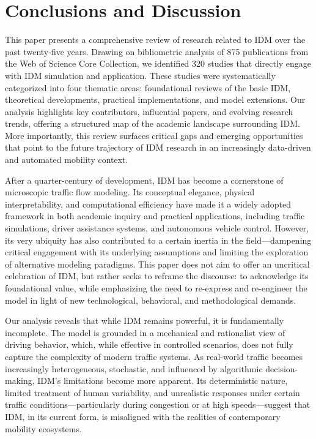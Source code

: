 \documentclass[a4paper,fleqn]{cas-sc}
\begin{document}
\section{Conclusions and Discussion}
\label{sec:conclusion}
This paper presents a comprehensive review of research related to IDM over the past twenty-five years. Drawing on bibliometric analysis of 875 publications from the Web of Science Core Collection, we identified 320 studies that directly engage with IDM simulation and application. These studies were systematically categorized into four thematic areas: foundational reviews of the basic IDM, theoretical developments, practical implementations, and model extensions. Our analysis highlights key contributors, influential papers, and evolving research trends, offering a structured map of the academic landscape surrounding IDM. More importantly, this review surfaces critical gaps and emerging opportunities that point to the future trajectory of IDM research in an increasingly data-driven and automated mobility context.

After a quarter-century of development, IDM has become a cornerstone of microscopic traffic flow modeling. Its conceptual elegance, physical interpretability, and computational efficiency have made it a widely adopted framework in both academic inquiry and practical applications, including traffic simulations, driver assistance systems, and autonomous vehicle control. However, its very ubiquity has also contributed to a certain inertia in the field—dampening critical engagement with its underlying assumptions and limiting the exploration of alternative modeling paradigms. This paper does not aim to offer an uncritical celebration of IDM, but rather seeks to reframe the discourse: to acknowledge its foundational value, while emphasizing the need to re-express and re-engineer the model in light of new technological, behavioral, and methodological demands.

Our analysis reveals that while IDM remains powerful, it is fundamentally incomplete. The model is grounded in a mechanical and rationalist view of driving behavior, which, while effective in controlled scenarios, does not fully capture the complexity of modern traffic systems. As real-world traffic becomes increasingly heterogeneous, stochastic, and influenced by algorithmic decision-making, IDM’s limitations become more apparent. Its deterministic nature, limited treatment of human variability, and unrealistic responses under certain traffic conditions—particularly during congestion or at high speeds—suggest that IDM, in its current form, is misaligned with the realities of contemporary mobility ecosystems.
\end{document}
